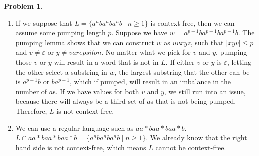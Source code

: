 \documentclass[11pt]{article}
\newcommand{\pipe}{\hspace{3pt}|\hspace{3pt}}
\theoremstyle{definition}
\theoremstyle{case}
\theoremstyle{theorem}
\newtheorem{prob}{Problem}
\begin{document}
\begin{prob}\end{prob}

\begin{enumerate}[label=(\alph*)]

\item
If we suppose that $L = \{a^n b a^n b a^n b \pipe n \geq 1 \}$ is context-free,
then we can assume some pumping length $p$. Suppose we have $w = a^{p-1} b a^{p-1} b a^{p - 1} b$.
The pumping lemma shows that we can construct $w$ as $uvxyz$, such that $|xyv| \leq p$ and
$v \neq \varepsilon$ or $y \neq varepsilon$. No matter what we pick for $v$ and $y$, pumping
those $v$ or $y$ will result in a word that is not in $L$. If either $v$ or $y$ is 
$\varepsilon$, letting the other select a substring in $w$, the largest substring that 
the other can be is $a^{p-1}b$ or $ba^{p-1}$, which if pumped, will result in an imbalance 
in the number of $a$s. If we have values for both $v$ and $y$, we still 
run into an issue, because there will always be a third set of $a$s that is
not being pumped. Therefore, $L$ is not context-free.

\item
We can use a regular language such as $aa*baa*baa*b$. $L \cap aa*baa*baa*b = \{a^n b a^n b a^n b \pipe n \geq 1\}$.
We already know that the right hand side is not context-free, which means $L$ cannot be context-free.

\end{enumerate}
\end{document}
